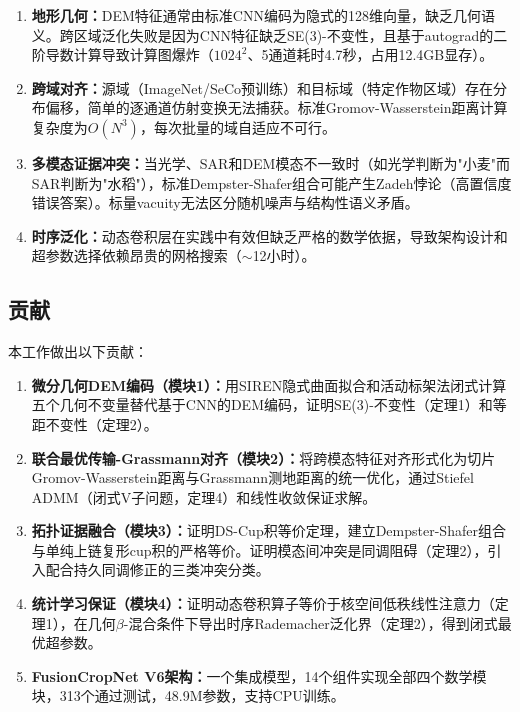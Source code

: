 \documentclass[12pt,a4paper]{ctexart}
\begin{document}
\begin{enumerate}
    \item \textbf{地形几何：}DEM特征通常由标准CNN编码为隐式的128维向量，缺乏几何语义。跨区域泛化失败是因为CNN特征缺乏SE(3)-不变性，且基于autograd的二阶导数计算导致计算图爆炸（$1024^2$、5通道耗时4.7秒，占用12.4GB显存）。

    \item \textbf{跨域对齐：}源域（ImageNet/SeCo预训练）和目标域（特定作物区域）存在分布偏移，简单的逐通道仿射变换无法捕获。标准Gromov-Wasserstein距离计算复杂度为$O(N^3)$，每次批量的域自适应不可行。

    \item \textbf{多模态证据冲突：}当光学、SAR和DEM模态不一致时（如光学判断为"小麦"而SAR判断为"水稻"），标准Dempster-Shafer组合可能产生Zadeh悖论（高置信度错误答案）。标量vacuity无法区分随机噪声与结构性语义矛盾。

    \item \textbf{时序泛化：}动态卷积层在实践中有效但缺乏严格的数学依据，导致架构设计和超参数选择依赖昂贵的网格搜索（$\sim$12小时）。
\end{enumerate}

\subsection{贡献}

本工作做出以下贡献：

\begin{enumerate}
    \item \textbf{微分几何DEM编码（模块1）：}用SIREN隐式曲面拟合和活动标架法闭式计算五个几何不变量替代基于CNN的DEM编码，证明SE(3)-不变性（定理1）和等距不变性（定理2）。

    \item \textbf{联合最优传输-Grassmann对齐（模块2）：}将跨模态特征对齐形式化为切片Gromov-Wasserstein距离与Grassmann测地距离的统一优化，通过Stiefel ADMM（闭式V子问题，定理4）和线性收敛保证求解。

    \item \textbf{拓扑证据融合（模块3）：}证明DS-Cup积等价定理，建立Dempster-Shafer组合与单纯上链复形cup积的严格等价。证明模态间冲突是同调阻碍（定理2），引入配合持久同调修正的三类冲突分类。

    \item \textbf{统计学习保证（模块4）：}证明动态卷积算子等价于核空间低秩线性注意力（定理1），在几何$\beta$-混合条件下导出时序Rademacher泛化界（定理2），得到闭式最优超参数。

    \item \textbf{FusionCropNet V6架构：}一个集成模型，14个组件实现全部四个数学模块，313个通过测试，48.9M参数，支持CPU训练。
\end{enumerate}
\end{document}
